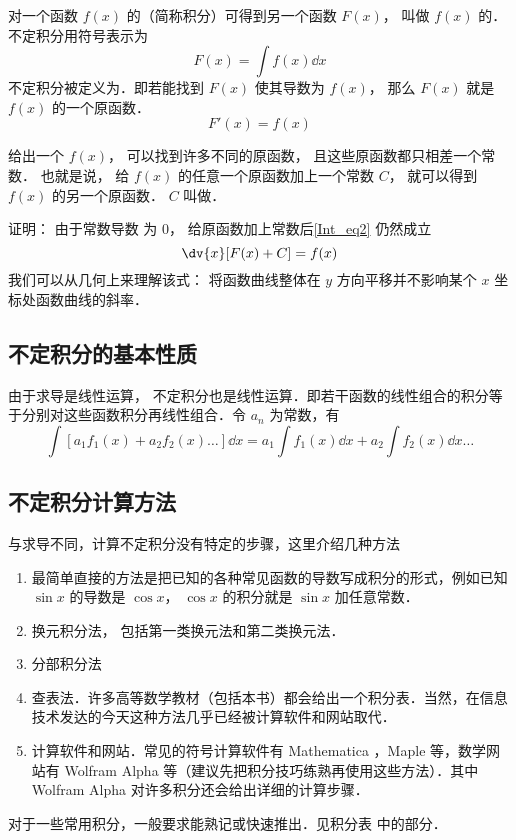 

对一个函数 $f(x)$ 的（简称积分）可得到另一个函数 $F(x)$， 叫做 $f(x)$ 的．不定积分用符号表示为
\begin{equation}\label{Int_eq1}
F(x) = \int f(x) \dd{x} 
\end{equation}
不定积分被定义为．即若能找到 $F(x)$ 使其导数为 $f(x)$， 那么 $F(x)$ 就是  $f(x)$ 的一个原函数．
\begin{equation}\label{Int_eq2}
F'(x) = f(x)
\end{equation}

给出一个 $f(x)$， 可以找到许多不同的原函数， 且这些原函数都只相差一个常数． 也就是说， 给 $f(x)$ 的任意一个原函数加上一个常数 $C$， 就可以得到 $f(x)$ 的另一个原函数． $C$ 叫做．

证明： 由于常数导数%
为 $0$， 给原函数加上常数后\autoref{Int_eq2} 仍然成立
\begin{equation}\label{Int_eq3}
\dv{x} [F(x) + C] = f(x)
\end{equation}
我们可以从几何上来理解该式： 将函数曲线整体在 $y$ 方向平移并不影响某个 $x$ 坐标处函数曲线的斜率．

\subsection{不定积分的基本性质}%

由于求导是线性运算，%
不定积分也是线性运算．即若干函数的线性组合的积分等于分别对这些函数积分再线性组合．令 $a_n$ 为常数，有
\begin{equation}\label{Int_eq4}
\int [a_1 f_1(x) + a_2 f_2(x)\dots] \dd{x}  = a_1 \int f_1(x) \dd{x} + a_2 \int f_2(x) \dd{x} \dots
\end{equation}

\subsection{不定积分计算方法}
与求导不同，计算不定积分没有特定的步骤，这里介绍几种方法
\begin{enumerate}
\item 最简单直接的方法是把已知的各种常见函数的导数写成积分的形式，例如已知 $\sin x$ 的导数是 $\cos x$， $\cos x$ 的积分就是 $\sin x$ 加任意常数．
\item 换元积分法， 包括第一类换元法和第二类换元法．

\item 分部积分法

\item 查表法．许多高等数学教材（包括本书）都会给出一个积分表．当然，在信息技术发达的今天这种方法几乎已经被计算软件和网站取代．

\item 计算软件和网站．常见的符号计算软件有 Mathematica %
，Maple 等，数学网站有 Wolfram Alpha %
等（建议先把积分技巧练熟再使用这些方法）．其中 Wolfram Alpha 对许多积分还会给出详细的计算步骤．
 \end{enumerate}

对于一些常用积分，一般要求能熟记或快速推出．见积分表 中的部分．%



